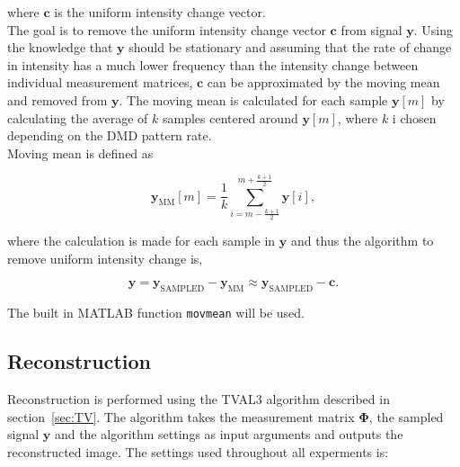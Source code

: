 where $\mathbf{c}$ is the uniform intensity change vector.\\[0.1in]

The goal is to remove the uniform intensity change vector $\mathbf{c}$ from signal $\mathbf{y}$. Using the knowledge that $\mathbf{y}$ should be stationary and assuming that the rate of change in intensity has a much lower frequency than the intensity change between individual measurement matrices, $\mathbf{c}$ can be approximated by the moving mean and removed from $\mathbf{y}$. The moving mean is calculated for each sample $\mathbf{y}[m]$ by calculating the average of $k$ samples centered around $\mathbf{y}[m]$, where $k$ i chosen depending on the DMD pattern rate.\\[0.1in]

Moving mean is defined as

\begin{equation}
\mathbf{y}_{\text{MM}}[m] = \frac{1}{k} \sum_{i = m-\frac{k+1}{2}}^{m + \frac{k+1}{2}} \mathbf{y}[i],
\end{equation}   
		 
where the calculation is made for each sample in $\mathbf{y}$ and thus the algorithm to remove uniform intensity change is,

\begin{equation}
\mathbf{y} = \mathbf{y}_{\text{SAMPLED}} - \mathbf{y}_{\text{MM}} \approx \mathbf{y}_{\text{SAMPLED}} -\mathbf{c}.
\end{equation}

The built in MATLAB function \texttt{movmean} will be used.
		 
%

\subsection{Reconstruction}
Reconstruction is performed using the TVAL3 algorithm described in section~\ref{sec:TV}. The algorithm takes the measurement matrix $\mathbf{\Phi}$, the sampled signal $\mathbf{y}$ and the algorithm settings as input arguments and outputs the reconstructed image. The settings used throughout all experments is:


